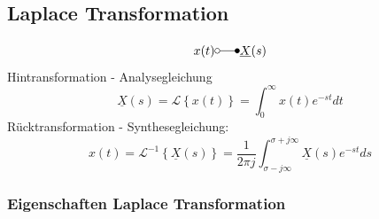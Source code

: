 \subsection{Laplace Transformation}

\begin{mdframed}[style=exercise]
	\[
		x(t) \laplace \underline{X}(s)
	\]
	Hintransformation - Analysegleichung
	\[
		\underline{X}(s) = \mathcal{L}\left\{ x(t) \right\} = \int_0^\infty x(t) e^{-st} dt
	\]
	Rücktransformation - Synthesegleichung:
	\[
		x(t) = \mathcal{L}^{-1}\left\{ \underline{X}(s) \right\} = \frac{1}{2\pi j}\int_{\sigma-j\infty}^{\sigma+j\infty} \underline{X}(s) e^{-st} ds
	\]
\end{mdframed}

\subsubsection{Eigenschaften Laplace Transformation}

